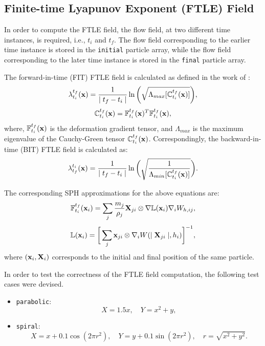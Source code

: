 \subsection{Finite-time Lyapunov Exponent (FTLE) Field}

In order to compute the FTLE field, the flow field, at two different time instances, is required, i.e., $t_i$ and $t_f$.
The flow field corresponding to the earlier time instance is stored in the \texttt{initial} particle array, while the flow field corresponding to the later time instance is stored in the \texttt{final} particle array.

The forward-in-time (FIT) FTLE field is calculated as defined in the work of \cite{sun2016detection}:
\begin{equation}
	\lambda_{t_i}^{t_f}(\mathbf{x}) = \frac{1}{\mid t_f - t_i \mid} \ln \bigg( \sqrt{\Lambda_{max}[ \mathbb{C}_{t_i}^{t_f}(\mathbf{x}) ]}  \bigg),
\end{equation}
\begin{equation}
  \mathbb{C}_{t_i}^{t_f}(\mathbf{x}) = \mathbb{F}_{t_i}^{t_f}(\mathbf{x})^T \mathbb{F}_{t_i}^{t_f}(\mathbf{x}),
\end{equation}
where, $\mathbb{F}_{t_i}^{t_f}(\mathbf{x})$ is the deformation gradient tensor, and $\Lambda_{max}$ is the maximum eigenvalue of the Cauchy-Green tensor $\mathbb{C}_{t_i}^{t_f}(\mathbf{x})$. Correspondingly, the backward-in-time (BIT) FTLE field is calculated as:
\begin{equation}
  \lambda_{t_f}^{t_i}(\mathbf{x}) = \frac{1}{\mid t_f - t_i \mid} \ln \bigg( \sqrt{ \frac{1}{\Lambda_{min}[ \mathbb{C}_{t_i}^{t_f}(\mathbf{x}) ]} }  \bigg).
\end{equation}

The corresponding SPH approximations for the above equations are:
\begin{equation}
  \mathbb{F}_{t_i}^{t_f}(\mathbf{x}_i) = \sum_{j} \frac{m_j}{\rho_j} \mathbf{X}_{ji} \otimes \nabla \mathbb{L}( \mathbf{x}_i ) \nabla_{i} W_{h, ij},
\end{equation}
\begin{equation}
  \mathbb{L}( \mathbf{x}_i ) = \bigg[ \sum_j \mathbf{x}_{ji} \otimes \nabla_i W(\mid \mathbf{X}_{ji} \mid, h_i) \bigg]^{-1},
\end{equation}
where $(\mathbf{x}_i, \mathbf{X}_i)$ corresponds to the initial and final position of the same particle.

In order to test the correctness of the FTLE field computation, the following test cases were devised.
\begin{itemize}
  \item \texttt{parabolic}:
  \begin{equation}
    X = 1.5x, \quad Y = x^2 + y,
  \end{equation}

  \item \texttt{spiral}:
  \begin{equation}
    X = x + 0.1 \cos(2 \pi r^2), \quad Y = y + 0.1 \sin(2 \pi r^2), \quad r = \sqrt{x^2 + y^2}.
    \end{equation}
\end{itemize}

